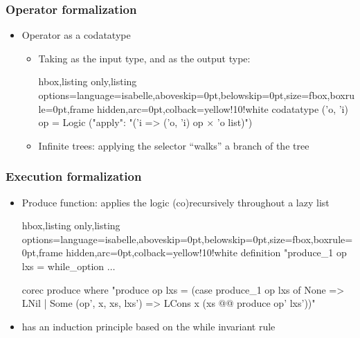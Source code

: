\documentclass[aspectratio=169,10pt]{beamer}
\begin{document}
\begin{frame}[fragile]
  \frametitle{Operator formalization}
  \begin{itemize}
    \item Operator as a codatatype
          \begin{itemize}
            \item Taking  as the input type, and  as the output type:
                  \vspace*{-1.5ex}
                  \begin{tcblisting}{hbox,listing only,listing options={language=isabelle,aboveskip=0pt,belowskip=0pt},size=fbox,boxrule=0pt,frame hidden,arc=0pt,colback=yellow!10!white}
codatatype ('o, 'i) op = Logic ("apply": "('i => ('o, 'i) op $\times$ 'o list)")
                  \end{tcblisting}
                  \vspace*{-1.5ex}
                  \pause
            \item Infinite trees: applying the selector  ``walks'' a branch of the tree
          \end{itemize}
  \end{itemize}
\end{frame}

\begin{frame}[fragile]
  \frametitle{Execution formalization}
  \begin{itemize}
    \item Produce function: applies the logic (co)recursively throughout a lazy list
          \vspace*{-1.5ex}
          \begin{tcblisting}{hbox,listing only,listing options={language=isabelle,aboveskip=0pt,belowskip=0pt},size=fbox,boxrule=0pt,frame hidden,arc=0pt,colback=yellow!10!white}
definition "produce_1 op lxs = while_option $\ldots$

corec produce where
"produce op lxs = (case produce_1 op lxs of
  None => LNil
| Some (op', x, xs, lxs') => LCons x (xs @@ produce op' lxs'))"
          \end{tcblisting}
          \vspace*{-1.5ex}
          \pause
    \item {} has an induction principle based on the while invariant rule
  \end{itemize}
\end{frame}
\end{document}
